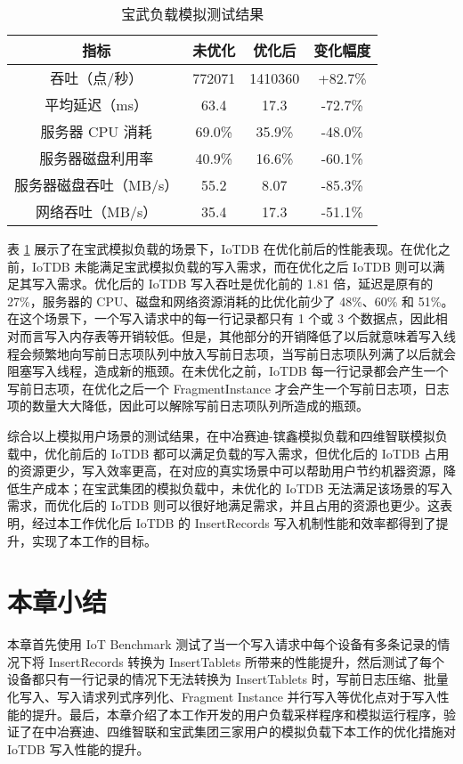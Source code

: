 \begin{table}
  \centering
  \caption{宝武负载模拟测试结果}
  \begin{tabular}{cccc}
    \toprule 
    指标 &  未优化  & 优化后 & 变化幅度 \\
    \midrule
    吞吐（点/秒） & 772071 & 1410360 & +82.7\%\\  
    平均延迟（ms） & 63.4 & 17.3 & -72.7\%\\  
    服务器 CPU 消耗 & 69.0\% & 35.9\% & -48.0\%\\  
    服务器磁盘利用率 & 40.9\% & 16.6\% & -60.1\%\\  
    服务器磁盘吞吐（MB/s） & 55.2 & 8.07 & -85.3\% \\  
    网络吞吐（MB/s） & 35.4 & 17.3 & -51.1\%\\ 
    \bottomrule
  \end{tabular}
  \label{tabular:bw-performance}
\end{table}
表 \ref{tabular:bw-performance} 展示了在宝武模拟负载的场景下，IoTDB 在优化前后的性能表现。在优化之前，IoTDB 未能满足宝武模拟负载的写入需求，而在优化之后 IoTDB 则可以满足其写入需求。优化后的 IoTDB 写入吞吐是优化前的 1.81 倍，延迟是原有的 27\%，服务器的 CPU、磁盘和网络资源消耗的比优化前少了 48\%、60\% 和 51\%。在这个场景下，一个写入请求中的每一行记录都只有 1 个或 3 个数据点，因此相对而言写入内存表等开销较低。但是，其他部分的开销降低了以后就意味着写入线程会频繁地向写前日志项队列中放入写前日志项，当写前日志项队列满了以后就会阻塞写入线程，造成新的瓶颈。在未优化之前，IoTDB 每一行记录都会产生一个写前日志项，在优化之后一个 FragmentInstance 才会产生一个写前日志项，日志项的数量大大降低，因此可以解除写前日志项队列所造成的瓶颈。

综合以上模拟用户场景的测试结果，在中冶赛迪-镔鑫模拟负载和四维智联模拟负载中，优化前后的 IoTDB 都可以满足负载的写入需求，但优化后的 IoTDB 占用的资源更少，写入效率更高，在对应的真实场景中可以帮助用户节约机器资源，降低生产成本；在宝武集团的模拟负载中，未优化的 IoTDB 无法满足该场景的写入需求，而优化后的 IoTDB 则可以很好地满足需求，并且占用的资源也更少。这表明，经过本工作优化后 IoTDB 的 InsertRecords 写入机制性能和效率都得到了提升，实现了本工作的目标。
\section{本章小结}
本章首先使用 IoT Benchmark 测试了当一个写入请求中每个设备有多条记录的情况下将 InsertRecords 转换为 InsertTablets 所带来的性能提升，然后测试了每个设备都只有一行记录的情况下无法转换为 InsertTablets 时，写前日志压缩、批量化写入、写入请求列式序列化、Fragment Instance 并行写入等优化点对于写入性能的提升。最后，本章介绍了本工作开发的用户负载采样程序和模拟运行程序，验证了在中冶赛迪、四维智联和宝武集团三家用户的模拟负载下本工作的优化措施对 IoTDB 写入性能的提升。